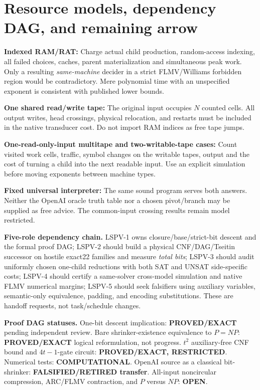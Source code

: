 \documentclass[11pt]{article}
\begin{document}
\section{Resource models, dependency DAG, and remaining arrow}
\noindent\textbf{Indexed RAM/RAT:} Charge actual child production, random-access indexing, all failed choices, caches, parent materialization and simultaneous peak work. Only a resulting \emph{same-machine} decider in a strict FLMV/Williams forbidden region would be contradictory. Mere polynomial time with an unspecified exponent is consistent with published lower bounds.

\noindent\textbf{One shared read/write tape:} The original input occupies $N$ counted cells. All output writes, head crossings, physical relocation, and restarts must be included in the native transducer cost. Do not import RAM indices as free tape jumps.

\noindent\textbf{One-read-only-input multitape and two-writable-tape cases:} Count visited work cells, traffic, symbol changes on the writable tapes, output and the cost of turning a child into the next readable input. Use an explicit simulation before moving exponents between machine types.

\noindent\textbf{Fixed universal interpreter:} The same sound program serves both answers. Neither the OpenAI oracle truth table nor a chosen pivot/branch may be supplied as free advice. The common-input crossing results remain model restricted.

\noindent\textbf{Five-role dependency chain.} LSPV-1 owns closure/base/strict-bit descent and the formal proof DAG; LSPV-2 should build a physical CNF/DAG/Tseitin successor on hostile exact22 families and measure \emph{total bits}; LSPV-3 should audit uniformly chosen one-child reductions with both SAT and UNSAT side-specific costs; LSPV-4 should certify a same-solver cross-model simulation and native FLMV numerical margins; LSPV-5 should seek falsifiers using auxiliary variables, semantic-only equivalence, padding, and encoding substitutions. These are handoff requests, not task/schedule changes.

\noindent\textbf{Proof DAG statuses.} One-bit descent implication: \textbf{PROVED/EXACT} pending independent review. Bare shrinker-existence equivalence to $P=NP$: \textbf{PROVED/EXACT} logical reformulation, not progress. $t^2$ auxiliary-free CNF bound and $4t-1$-gate circuit: \textbf{PROVED/EXACT, RESTRICTED}. Numerical tests: \textbf{COMPUTATIONAL}. OpenAI source as a classical bit-shrinker: \textbf{FALSIFIED/RETIRED transfer}. All-input noncircular compression, ARC/FLMV contraction, and $P$ versus $NP$: \textbf{OPEN}.
\end{document}
